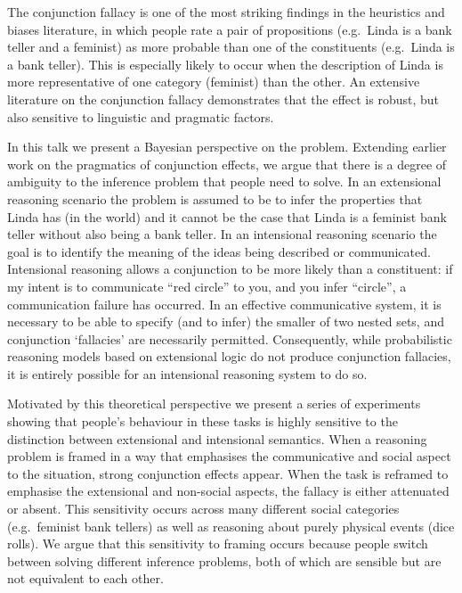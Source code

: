 \documentclass[]{article}
\begin{document}
The conjunction fallacy is one of the most striking findings in the
heuristics and biases literature, in which people rate a pair of
propositions (e.g.~Linda is a bank teller and a feminist) as more
probable than one of the constituents (e.g.~Linda is a bank teller).
This is especially likely to occur when the description of Linda is more
representative of one category (feminist) than the other. An extensive
literature on the conjunction fallacy demonstrates that the effect is
robust, but also sensitive to linguistic and pragmatic factors.

In this talk we present a Bayesian perspective on the problem. Extending
earlier work on the pragmatics of conjunction effects, we argue that
there is a degree of ambiguity to the inference problem that people need
to solve. In an extensional reasoning scenario the problem is assumed to
be to infer the properties that Linda has (in the world) and it cannot
be the case that Linda is a feminist bank teller without also being a
bank teller. In an intensional reasoning scenario the goal is to
identify the meaning of the ideas being described or communicated.
Intensional reasoning allows a conjunction to be more likely than a
constituent: if my intent is to communicate ``red circle'' to you, and
you infer ``circle'', a communication failure has occurred. In an
effective communicative system, it is necessary to be able to specify
(and to infer) the smaller of two nested sets, and conjunction
`fallacies' are necessarily permitted. Consequently, while probabilistic
reasoning models based on extensional logic do not produce conjunction
fallacies, it is entirely possible for an intensional reasoning system
to do so.

Motivated by this theoretical perspective we present a series of
experiments showing that people's behaviour in these tasks is highly
sensitive to the distinction between extensional and intensional
semantics. When a reasoning problem is framed in a way that emphasises
the communicative and social aspect to the situation, strong conjunction
effects appear. When the task is reframed to emphasise the extensional
and non-social aspects, the fallacy is either attenuated or absent. This
sensitivity occurs across many different social categories
(e.g.~feminist bank tellers) as well as reasoning about purely physical
events (dice rolls). We argue that this sensitivity to framing occurs
because people switch between solving different inference problems, both
of which are sensible but are not equivalent to each other.\\
\pagebreak  
\end{document}
